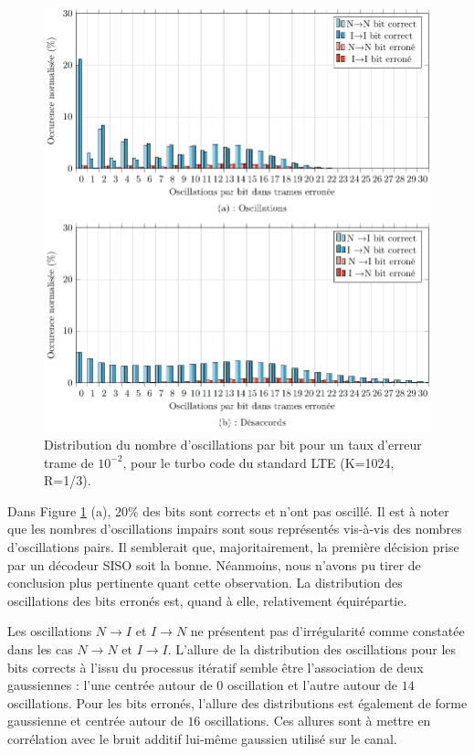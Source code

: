 \begin{figure}[!t]
	\centering
	\includegraphics[width=.8\textwidth]{main/ch2_fig/tikz/d_lte_10-2.pdf}
	\caption{Distribution du nombre d'oscillations par bit pour un taux d'erreur trame de $10^{-2}$, pour le turbo code du standard LTE (K=1024, R=1/3). \label{fig:d_lte_10-2}}
\end{figure}

Dans Figure \ref{fig:d_lte_10-2} (a), $20\%$ des bits sont corrects et n'ont pas oscillé. Il est à noter que 
les nombres d'oscillations impairs sont sous représentés vis-à-vis des nombres d'oscillations pairs. Il semblerait que, 
majoritairement, la première décision prise par un décodeur SISO soit la bonne. Néanmoins, nous n'avons pu tirer de
conclusion plus pertinente quant 
cette observation. La distribution des oscillations des bits erronés est, quand à elle, relativement équirépartie. 

Les oscillations $N\rightarrow I$ et $I\rightarrow N$ ne présentent pas d’irrégularité comme constatée dans les cas 
$N\rightarrow N$ et $I\rightarrow I$. L'allure de la distribution des oscillations pour les bits corrects à l'issu du 
processus itératif semble être l'association de deux gaussiennes : l'une centrée autour de $0$ oscillation et l'autre 
autour de $14$ oscillations. Pour les 
bits erronés, l'allure des distributions est également de forme gaussienne et centrée autour de $16$ oscillations. Ces 
allures sont à
mettre en corrélation avec le bruit additif lui-même gaussien utilisé sur le canal.

